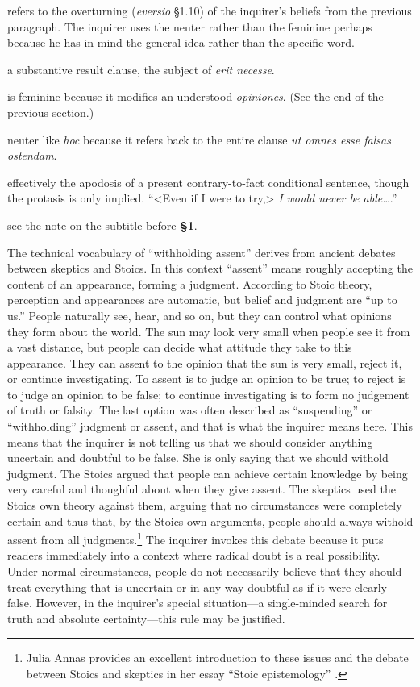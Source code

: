  refers to the overturning (\textit{eversio} §1.10) of the inquirer's beliefs from the previous paragraph. The inquirer uses the neuter rather than the feminine perhaps because he has in mind the general idea rather than the specific word.

 a substantive result clause, the subject of \textit{erit necesse}.

 is feminine because it modifies an understood \textit{opiniones}. (See the end of the previous section.)

 neuter like \textit{hoc} because it refers back to the entire clause \textit{ut omnes esse falsas ostendam}.

 effectively the apodosis of a present contrary-to-fact conditional sentence, though the protasis is only implied. ``<Even if I were to try,> \textit{I would never be able\dots}.''

 see the note on the subtitle before \textbf{§1}.

 The technical vocabulary of ``withholding assent'' derives from ancient debates between skeptics and Stoics. In this context ``assent'' means roughly accepting the content of an appearance, forming a judgment. According to Stoic theory, perception and appearances are automatic, but belief and judgment are ``up to us.'' People naturally see, hear, and so on, but they can control what opinions they form about the world. The sun may look very small when people see it from a vast distance, but people can decide what attitude they take to this appearance. They can assent to the opinion that the sun is very small, reject it, or continue investigating. To assent is to judge an opinion to be true; to reject is to judge an opinion to be false; to continue investigating is to form no judgement of truth or falsity. The last option was often described as ``suspending'' or ``withholding'' judgment or assent, and that is what the inquirer means here. This means that the inquirer is not telling us that we should consider anything uncertain and doubtful to be false. She is only saying that we should withold judgment. The Stoics argued that people can achieve certain knowledge by being very careful and thoughful about when they give assent. The skeptics used the Stoics own theory against them, arguing that no circumstances were completely certain and thus that, by the Stoics own arguments, people should always withold assent from all judgments.\footnote{Julia Annas provides an excellent introduction to these issues and the debate between Stoics and skeptics in her essay ``Stoic epistemology'' \parencite{annas1990}.} The inquirer invokes this debate because it puts readers immediately into a context where radical doubt is a real possibility. Under normal circumstances, people do not necessarily believe that they should treat everything that is uncertain or in any way doubtful as if it were clearly false. However, in the inquirer's special situation---a single-minded search for truth and absolute certainty---this rule may be justified.

